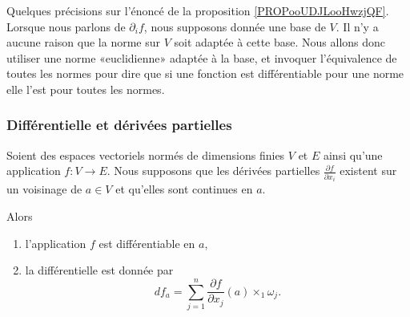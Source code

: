 \begin{normaltext}      \label{NORMooDAZZooDiGFoW}
    Quelques précisions sur l'énoncé de la proposition \ref{PROPooUDJLooHwzjQF}. Lorsque nous parlons de \( \partial_if\), nous supposons donnée une base de \( V\). Il n'y a aucune raison que la norme sur \( V\) soit adaptée à cette base. Nous allons donc utiliser une norme «euclidienne» adaptée à la base, et invoquer l'équivalence de toutes les normes pour dire que si une fonction est différentiable pour une norme elle l'est pour toutes les normes.
\end{normaltext}

\subsubsection{Différentielle et dérivées partielles}

\begin{proposition}     \label{PROPooUDJLooHwzjQF}
    Soient des espaces vectoriels normés de dimensions finies \( V\) et \( E\) ainsi qu'une application \( f\colon V\to E\). Nous supposons que les dérivées partielles \( \frac{ \partial f }{ \partial x_i }\) existent sur un voisinage de \( a\in V\) et qu'elles sont continues en \( a\).
    
    Alors
    \begin{enumerate}
        \item
            l'application \( f\) est différentiable en \( a\),
        \item
            la différentielle est donnée par
            \begin{equation}
                df_a=\sum_{j=1}^n\frac{ \partial f }{ \partial x_j }(a)\times_1\omega_j.
            \end{equation}
    \end{enumerate}
\end{proposition}

